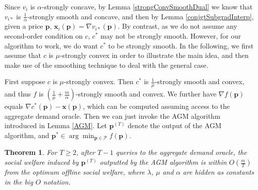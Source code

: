 \documentclass{article}
\newtheorem{theorem}{Theorem}[section]
\begin{document}
Since $v_i$ is $\alpha$-strongly concave, by Lemma \ref{strongConvSmoothDual} we know that $v_{i*}$ is $\frac{1}{\alpha}$-strongly smooth and concave, and then by Lemma \ref{conjgtSubgradInterp}, given a price $\mathbf{p}$, $\mathbf{x}_i(\mathbf{p})=\nabla v_{i*}(\mathbf{p})$. By contrast, as we do not assume any second-order condition on $c$, $c^*$ may not be strongly smooth. However, for our algorithm to work, we do want $c^*$ to be strongly smooth. In the following, we first assume that $c$ is $\mu$-strongly convex in order to illustrate the main idea, and then make use of the smoothing technique to deal with the general case.

First suppose $c$ is $\mu$-strongly convex. Then $c^*$ is $\frac{1}{\mu}$-strongly smooth and convex, and thus $f$ is $(\frac{1}{\mu}+\frac{m}{\alpha})$-strongly smooth and convex. We further have $\nabla f(\mathbf{p})$ equals $\nabla c^*(\mathbf{p})-\mathbf{x}(\mathbf{p})$, which can be computed assuming access to the aggregate demand oracle. Then we can just invoke the AGM algorithm introduced in Lemma \ref{AGM}. Let $\mathbf{p}^{(T)}$ denote the output of the AGM algorithm, and $\mathbf{p}^*\in\arg\min_{\mathbf{p}\in \mathcal{P}}f(\mathbf{p})$.
\begin{theorem}\label{offlineGuaranteeStrongConv}
    For $T\ge2$, after $T-1$ queries to the aggregate demand oracle, the social welfare induced by $\mathbf{p}^{(T)}$ outputted by the AGM algorithm is within $O(\frac{m}{T})$ from the optimum offline social welfare, where $\lambda$, $\mu$ and $\alpha$ are hidden as constants in the big $O$ notation.
\end{theorem}
\end{document}
